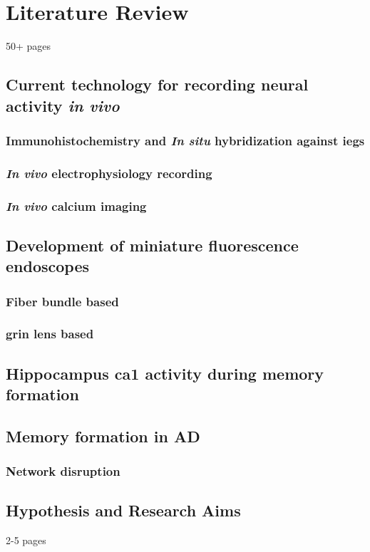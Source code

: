 \chapter{Literature Review}
50+ pages

\section{Current technology for recording neural activity \textit{in vivo}}
\subsection{Immunohistochemistry and \textit{In situ} hybridization against \glspl{ieg}}
\subsection{\textit{In vivo} electrophysiology recording}
\subsection{\textit{In vivo} calcium imaging}

\section{Development of miniature fluorescence endoscopes}
\subsection{Fiber bundle based}
\subsection{\gls{grin} lens based}

\section{Hippocampus \gls{ca1} activity during memory formation}

\section{Memory formation in \gls{AD}}
\subsection{Network disruption}

\section{Hypothesis and Research Aims}
2-5 pages
